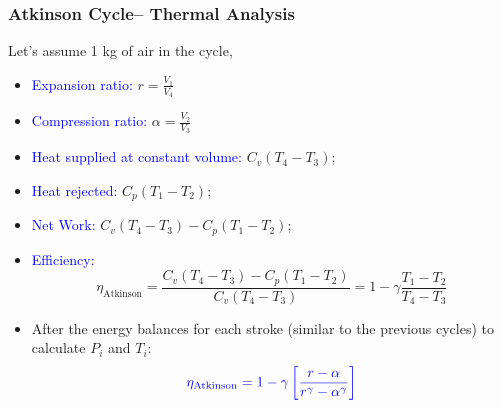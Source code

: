 \documentclass[10pt,compress]{beamer}
\newcommand{\frc}{\displaystyle\frac}
\begin{document}
\begin{frame}
 \frametitle{Atkinson Cycle-- Thermal Analysis}
   Let's assume 1 kg of air in the cycle,
    \begin{itemize}
     \item <1-> \textcolor{blue}{Expansion ratio: } $r=\frc{V_{1}}{V_{4}}$
     \item <2-> \textcolor{blue}{Compression ratio:} $\alpha=\frc{V_{2}}{V_{3}}$
     \item <3-> \textcolor{blue}{Heat supplied at constant volume:} $C_{v}\left(T_{4}-T_{3}\right)$;
     \item <4-> \textcolor{blue}{Heat rejected:} $C_{p}\left(T_{1}-T_{2}\right)$;
     \item <5-> \textcolor{blue}{Net Work:} $C_{v}\left(T_{4}-T_{3}\right)-C_{p}\left(T_{1}-T_{2}\right)$;
     \item <6-> \textcolor{blue}{Efficiency:}
      \begin{displaymath}
       \eta_{\text{Atkinson}} = \frc{C_{v}\left(T_{4}-T_{3}\right)-C_{p}\left(T_{1}-T_{2}\right)}{C_{v}\left(T_{4}-T_{3}\right)}=1-\gamma\frc{T_{1}-T_{2}}{T_{4}-T_{3}}
      \end{displaymath}
    \item <7-> After the energy balances for each stroke (similar to the previous cycles) to calculate $P_{i}$ and $T_{i}$:
         \begin{displaymath}
         \textcolor{blue}{\eta_{\text{Atkinson}} = 1 - \gamma\left[\frc{r - \alpha}{r^{\gamma}-\alpha^{\gamma}}\right]}
         \end{displaymath}
    \end{itemize}
\end{frame}
\end{document}
